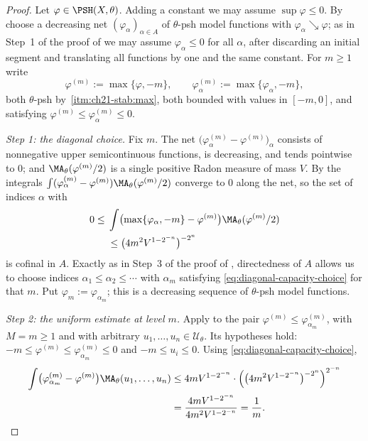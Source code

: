 \begin{proof}
Let \(\varphi\in\PSH(X,\theta)\).  Adding a constant we may assume
\(\sup\varphi\leq0\).  By  choose a
decreasing net \((\varphi_\alpha)_{\alpha\in A}\) of \(\theta\)-psh model
functions with \(\varphi_\alpha\searrow\varphi\); as in Step~1 of the proof
of  we may assume \(\varphi_\alpha\leq0\)
for all \(\alpha\), after discarding an initial segment and translating all
functions by one and the same constant.  For \(m\geq1\) write
\[
 \varphi^{(m)}:=\max\{\varphi,-m\},\qquad
 \varphi^{(m)}_\alpha:=\max\{\varphi_\alpha,-m\} ,
\]
both \(\theta\)-psh by
\,\cref{itm:ch21-stab:max}, both bounded with values
in \([-m,0]\), and satisfying
\(\varphi^{(m)}\leq\varphi^{(m)}_\alpha\leq0\).

\emph{Step 1: the diagonal choice.}  Fix \(m\).  The net
\(\bigl(\varphi^{(m)}_\alpha-\varphi^{(m)}\bigr)_\alpha\) consists of
nonnegative upper semicontinuous functions, is decreasing, and tends
pointwise to \(0\); and \(\MA_\theta(\varphi^{(m)}/2)\) is a single positive
Radon measure of mass \(V\).  By  the
integrals
\(\int(\varphi^{(m)}_\alpha-\varphi^{(m)})\MA_\theta(\varphi^{(m)}/2)\)
converge to \(0\) along the net, so the set of indices \(\alpha\) with
\begin{equation}
\label{eq:diagonal-capacity-choice}
\begin{split}
0\leq{}&\int\bigl(\max\{\varphi_{\alpha},-m\}-\varphi^{(m)}\bigr)
               \MA_\theta(\varphi^{(m)}/2)\\
&\leq \bigl(4m^2V^{1-2^{-n}}\bigr)^{-2^n}
\end{split}
\end{equation}
is cofinal in \(A\).  Exactly as in Step~3 of the proof of
, directedness of \(A\) allows us to choose
indices \(\alpha_1\leq\alpha_2\leq\cdots\) with \(\alpha_m\) satisfying
\eqref{eq:diagonal-capacity-choice} for that \(m\).  Put
\(\varphi_m:=\varphi_{\alpha_m}\); this is a decreasing sequence of
\(\theta\)-psh model functions.

\emph{Step 2: the uniform estimate at level \(m\).}  Apply
 to the pair
\(\varphi^{(m)}\leq\varphi^{(m)}_{\alpha_m}\), with \(M=m\geq1\) and with
arbitrary \(u_1,\ldots,u_n\in\mathcal U_\theta\).  Its hypotheses hold:
\(-m\leq\varphi^{(m)}\leq\varphi^{(m)}_{\alpha_m}\leq0\) and
\(-m\leq u_i\leq0\).  Using \eqref{eq:diagonal-capacity-choice},
\[
 \begin{aligned}
 \int\bigl(\varphi^{(m)}_{\alpha_m}-\varphi^{(m)}\bigr)
       \MA_\theta(u_1,\ldots,u_n)
 &\leq4mV^{1-2^{-n}}\cdot
   \Bigl(\bigl(4m^2V^{1-2^{-n}}\bigr)^{-2^n}\Bigr)^{2^{-n}}
 \\
 &=\frac{4mV^{1-2^{-n}}}{4m^2V^{1-2^{-n}}}
  =\frac1m .
 \end{aligned}
\]


\end{proof}
